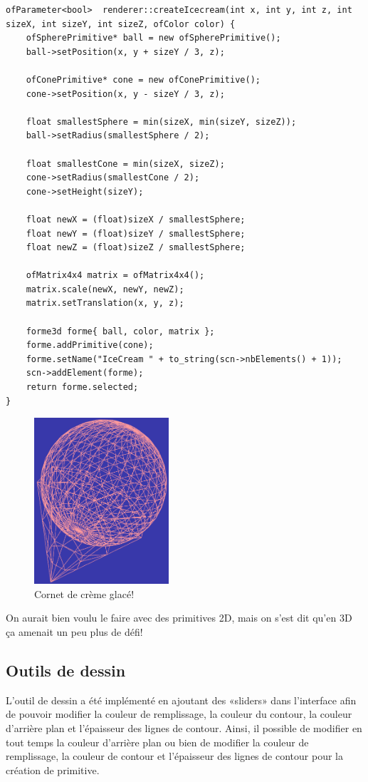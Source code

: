 \begin{lstlisting}
ofParameter<bool>  renderer::createIcecream(int x, int y, int z, int sizeX, int sizeY, int sizeZ, ofColor color) {
	ofSpherePrimitive* ball = new ofSpherePrimitive();
	ball->setPosition(x, y + sizeY / 3, z);
	
	ofConePrimitive* cone = new ofConePrimitive();
	cone->setPosition(x, y - sizeY / 3, z);
	
	float smallestSphere = min(sizeX, min(sizeY, sizeZ));
	ball->setRadius(smallestSphere / 2);
	
	float smallestCone = min(sizeX, sizeZ);
	cone->setRadius(smallestCone / 2);
	cone->setHeight(sizeY);
	
	float newX = (float)sizeX / smallestSphere;
	float newY = (float)sizeY / smallestSphere;
	float newZ = (float)sizeZ / smallestSphere;
	
	ofMatrix4x4 matrix = ofMatrix4x4();
	matrix.scale(newX, newY, newZ);
	matrix.setTranslation(x, y, z);
	
	forme3d forme{ ball, color, matrix };
	forme.addPrimitive(cone);
	forme.setName("IceCream " + to_string(scn->nbElements() + 1));
	scn->addElement(forme);
	return forme.selected;
}
\end{lstlisting}

\begin{figure}[h]
	\centering
	\includegraphics[width=5cm]{fig/iceCream.png}
	\caption{Cornet de crème glacé!}
	\label{fig:iceCream}
\end{figure}

On aurait bien voulu le faire avec des primitives 2D, mais on s'est dit qu'en 3D ça amenait un peu plus de défi!

\subsection{Outils de dessin}
L'outil de dessin a été implémenté en ajoutant des «sliders» dans l'interface afin de pouvoir modifier la couleur de remplissage, la couleur du contour, la couleur d'arrière plan et l'épaisseur des lignes de contour. Ainsi, il possible de modifier en tout temps la couleur d'arrière plan ou bien de modifier la couleur de remplissage, la couleur de contour et l'épaisseur des lignes de contour pour la création de primitive.\\

